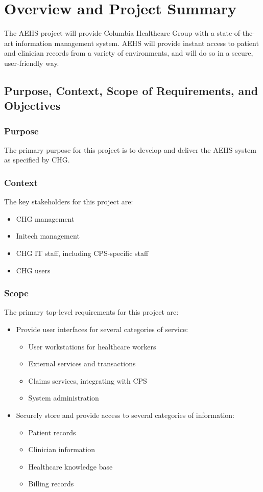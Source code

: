 \documentclass[11pt]{article}
\begin{document}
\section{Overview and Project Summary}

The AEHS project will provide Columbia Healthcare Group with a state-of-the-art information
management system.  AEHS will provide instant access to patient and clinician records from a variety
of environments, and will do so in a secure, user-friendly way.


\subsection{Purpose, Context, Scope of Requirements, and Objectives}

\subsubsection{Purpose}
The primary purpose for this project is to develop and deliver the AEHS system as specified by CHG.

\subsubsection{Context}
The key stakeholders for this project are:
\begin{itemize}
\item CHG management
\item Initech management
\item CHG IT staff, including CPS-specific staff
\item CHG users
\end{itemize}

\subsubsection{Scope}
The primary top-level requirements for this project are:
\begin{itemize}
\item Provide user interfaces for several categories of service:
  \begin{itemize}
  \item User workstations for healthcare workers
  \item External services and transactions
  \item Claims services, integrating with CPS
  \item System administration
  \end{itemize}
\item Securely store and provide access to several categories of information:
  \begin{itemize}
  \item Patient records
  \item Clinician information
  \item Healthcare knowledge base
  \item Billing records
  \end{itemize}
\end{itemize}
\end{document}
